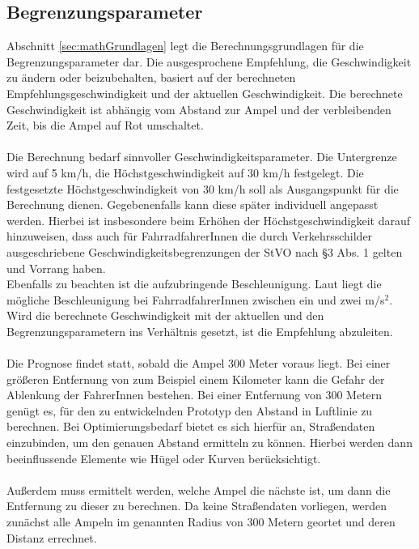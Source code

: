 \subsection{Begrenzungsparameter}
Abschnitt \ref{sec:mathGrundlagen} legt die Berechnungsgrundlagen für die Begrenzungsparameter dar. Die ausgesprochene Empfehlung, die Geschwindigkeit zu ändern oder beizubehalten, basiert auf der berechneten Empfehlungsgeschwindigkeit und der aktuellen Geschwindigkeit. Die berechnete Geschwindigkeit ist abhängig vom Abstand zur Ampel und der verbleibenden Zeit, bis die Ampel auf Rot umschaltet.\\\\
Die Berechnung bedarf sinnvoller Geschwindigkeitsparameter. Die Untergrenze wird auf 5 km/h, die Höchstgeschwindigkeit auf 30 km/h festgelegt. Die festgesetzte Höchstgeschwindigkeit von 30 km/h soll als Ausgangspunkt für die Berechnung dienen. Gegebenenfalls kann diese später individuell angepasst werden. 
Hierbei ist insbesondere beim Erhöhen der Höchstgeschwindigkeit darauf hinzuweisen, dass auch für FahrradfahrerInnen die durch Verkehrsschilder ausgeschriebene Geschwindigkeitsbegrenzungen der StVO nach \S 3 Abs. 1 gelten und Vorrang haben. \\
Ebenfalls zu beachten ist die aufzubringende Beschleunigung. Laut \cite{beschleunigung} liegt die mögliche Beschleunigung bei FahrradfahrerInnen zwischen ein und zwei m/s$^{2}$. Wird die berechnete Geschwindigkeit mit der aktuellen und den Begrenzungsparametern ins Verhältnis gesetzt, ist die Empfehlung abzuleiten.\\\\ 
Die Prognose findet statt, sobald die Ampel 300 Meter voraus liegt. Bei einer größeren Entfernung von zum Beispiel einem Kilometer kann die Gefahr der Ablenkung der FahrerInnen bestehen. Bei einer Entfernung von 300 Metern genügt es, für den zu entwickelnden Prototyp den Abstand in Luftlinie zu berechnen. Bei Optimierungsbedarf bietet es sich hierfür an, Straßendaten einzubinden, um den genauen Abstand ermitteln zu können. Hierbei werden dann beeinflussende Elemente wie Hügel oder Kurven berücksichtigt.\\\\
Außerdem muss ermittelt werden, welche Ampel die nächste ist, um dann die Entfernung zu dieser zu berechnen. Da keine Straßendaten vorliegen, werden zunächst alle Ampeln im genannten Radius von 300 Metern geortet und deren Distanz errechnet.
